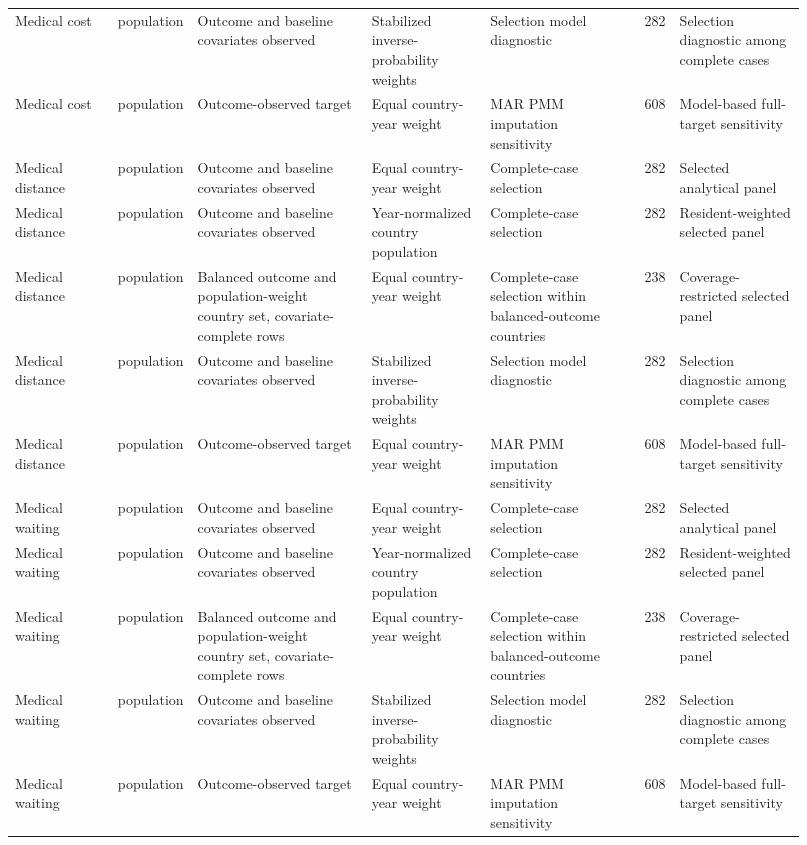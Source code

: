 \begin{tabular}{p{0.13\linewidth}p{0.08\linewidth}p{0.22\linewidth}p{0.15\linewidth}p{0.18\linewidth}rp{0.16\linewidth}}
Medical cost & population & Outcome and baseline covariates observed & Stabilized inverse-probability weights & Selection model diagnostic & 282 & Selection diagnostic among complete cases \\
Medical cost & population & Outcome-observed target & Equal country-year weight & MAR PMM imputation sensitivity & 608 & Model-based full-target sensitivity \\
Medical distance & population & Outcome and baseline covariates observed & Equal country-year weight & Complete-case selection & 282 & Selected analytical panel \\
Medical distance & population & Outcome and baseline covariates observed & Year-normalized country population & Complete-case selection & 282 & Resident-weighted selected panel \\
Medical distance & population & Balanced outcome and population-weight country set, covariate-complete rows & Equal country-year weight & Complete-case selection within balanced-outcome countries & 238 & Coverage-restricted selected panel \\
Medical distance & population & Outcome and baseline covariates observed & Stabilized inverse-probability weights & Selection model diagnostic & 282 & Selection diagnostic among complete cases \\
Medical distance & population & Outcome-observed target & Equal country-year weight & MAR PMM imputation sensitivity & 608 & Model-based full-target sensitivity \\
Medical waiting & population & Outcome and baseline covariates observed & Equal country-year weight & Complete-case selection & 282 & Selected analytical panel \\
Medical waiting & population & Outcome and baseline covariates observed & Year-normalized country population & Complete-case selection & 282 & Resident-weighted selected panel \\
Medical waiting & population & Balanced outcome and population-weight country set, covariate-complete rows & Equal country-year weight & Complete-case selection within balanced-outcome countries & 238 & Coverage-restricted selected panel \\
Medical waiting & population & Outcome and baseline covariates observed & Stabilized inverse-probability weights & Selection model diagnostic & 282 & Selection diagnostic among complete cases \\
Medical waiting & population & Outcome-observed target & Equal country-year weight & MAR PMM imputation sensitivity & 608 & Model-based full-target sensitivity \\
\bottomrule
\end{tabular}
